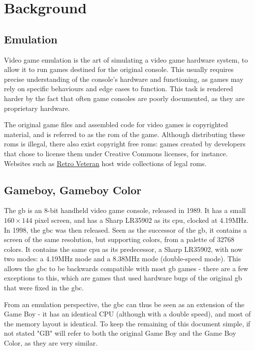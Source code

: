 \documentclass[11pt]{report}
\begin{document}
\printnoidxglossary[type=\acronymtype]
\printnoidxglossary[type=main]

\clearpage

\chapter{Background}

\section{Emulation}

Video game emulation is the art of simulating a video game hardware system, to allow it to run games destined for the original console. This usually requires precise understanding of the console's hardware and functioning, as games may rely on specific behaviours and edge cases to function. This task is rendered harder by the fact that often game consoles are poorly documented, as they are proprietary hardware.

The original game files and assembled code for video games is copyrighted material, and is referred to as the \gls{rom} of the game. Although distributing these \glspl{rom} is illegal, there also exist copyright free \glspl{rom}: games created by developers that chose to license them under Creative Commons licenses, for instance. Websites such as \href{https://www.retroveteran.com/category/nintendo-game-boy-color/}{Retro Veteran} host wide collections of legal \glspl{rom}.

\section{Gameboy, Gameboy Color}

The \gls{gb} is an 8-bit handheld video game console, released in 1989. It has a small $160 \times 144$ pixel screen, and has a Sharp LR35902 as its \gls{cpu}, clocked at 4.19MHz. In 1998, the \gls{gbc} was then released. Seen as the successor of the \gls{gb}, it contains a screen of the same resolution, but supporting colors, from a palette of 32768 colors. It contains the same \gls{cpu} as its predecessor, a Sharp LR35902, with now two modes: a 4.19MHz mode and a 8.38MHz mode (double-speed mode). This allows the \gls{gbc} to be backwards compatible with most \gls{gb} games - there are a few exceptions to this, which are games that used hardware bugs of the original \gls{gb} that were fixed in the \gls{gbc}.

From an emulation perspective, the \glsdesc{gbc} can thus be seen as an extension of the Game Boy - it has an identical CPU (although with a double speed), and most of the memory layout is identical. To keep the remaining of this document simple, if not stated "GB" will refer to both the original Game Boy and the Game Boy Color, as they are very similar.
\end{document}

